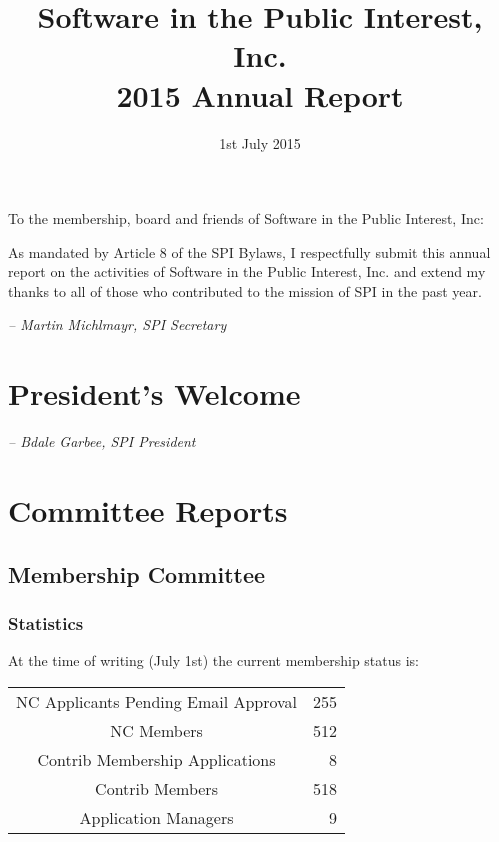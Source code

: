\documentclass[letterpaper]{report}
\begin{document}
\title{Software in the Public Interest, Inc.\\
2015 Annual Report}
\date{1st July 2015}

\maketitle

To the membership, board and friends of Software in the Public Interest, Inc:

As mandated by Article 8 of the SPI Bylaws, I respectfully submit this annual
report on the activities of Software in the Public Interest, Inc. and extend my
thanks to all of those who contributed to the mission of SPI in the past year.

  \emph{-- Martin Michlmayr, SPI Secretary}

\newpage

\tableofcontents

\newpage

\chapter{President's Welcome}
\label{sec:president}

  \emph{-- Bdale Garbee, SPI President}

\chapter{Committee Reports}
\section{Membership Committee}

\subsection{Statistics}

At the time of writing (July 1st) the current membership status is:

\begin{tabular}{ | c | r | }
\hline
NC Applicants Pending Email Approval	& 255\\
NC Members				& 512\\
Contrib Membership Applications		& 8\\
Contrib Members				& 518\\
Application Managers			& 9\\
\hline
\end{tabular}
\end{document}
